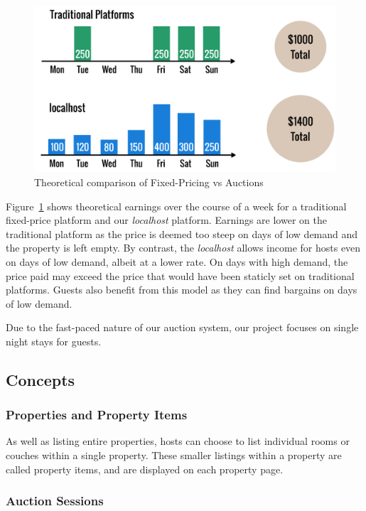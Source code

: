 \begin{figure}[!h]
  \includegraphics[width=\linewidth]{assets/fixedvsdynamic.png}
  \caption{Theoretical comparison of Fixed-Pricing vs Auctions}
  \label{fig:fixedVsDynamic}
\end{figure}

Figure~\ref{fig:fixedVsDynamic} shows theoretical earnings over the course of
a week for a traditional fixed-price platform and our \emph{localhost} platform.
Earnings are lower on the traditional platform as the price is deemed too steep
on days of low demand and the property is left empty.
By contrast, the \emph{localhost} allows income for hosts even on days of low demand,
albeit at a lower rate. On days with high demand, the price paid may exceed the
price that would have been staticly set on traditional platforms. Guests also benefit
from this model as they can find bargains on days of low demand.

Due to the fast-paced nature of our auction system, our project focuses on
single night stays for guests.

\subsection{Concepts}

\subsubsection{Properties and Property Items}

As well as listing entire properties, hosts can choose to list individual rooms or
couches within a single property. These smaller listings within a property are
called property items, and are displayed on each property page.

\subsubsection{Auction Sessions}

